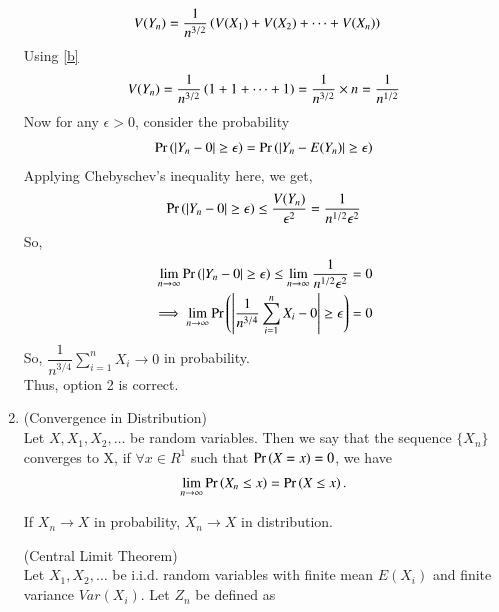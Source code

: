 \documentclass[journal,12pt,twocolumn]{IEEEtran}
\begin{document}
\begin{enumerate}
\begin{align}
            V(Y_n) &= \dfrac{1}{n^{3/2}}\left(V(X_1)+V(X_2)+ \dots +V(X_n)\right)
        \end{align}
        Using \eqref{b}
        \begin{align}
            V(Y_n)=\dfrac{1}{n^{3/2}}\left(1+1+ \dots +1\right)=\dfrac{1}{n^{3/2}}\times n=\dfrac{1}{n^{1/2}}
        \end{align}
        Now for any $\epsilon>0$, consider the probability
        \begin{align}
            \Pr\left(|Y_n-0|\geq \epsilon\right)=\Pr\left(|Y_n-E(Y_n)|\geq \epsilon\right)
        \end{align}
        Applying Chebyschev's inequality here, we get,
        \begin{align}
            \Pr\left(|Y_n-0|\geq \epsilon\right) \leq \dfrac{V(Y_n)}{\epsilon^2} = \dfrac{1}{n^{1/2}\epsilon^2}
        \end{align}
        So,
        \begin{align}
            \lim_{n \to \infty}\Pr\left(|Y_n-0|\geq \epsilon\right) \leq \lim_{n \to \infty }\dfrac{1}{n^{1/2}\epsilon^2}=0\\
            \implies \lim_{n \to \infty}\Pr\left(\left | \dfrac{1}{n^{3/4}}\sum_{i=1}^nX_i - 0 \right|\geq \epsilon\right)=0
        \end{align}
        So, $\dfrac{1}{n^{3/4}}\sum_{i=1}^nX_i \to 0$ in probability.\\
        Thus, option 2 is correct.
    \item
        \begin{definition}
        (Convergence in Distribution)\\
        Let $X, X_1, X_2,\dots $ be random variables. Then we say that the sequence $\{X_n\}$ converges to X, if $\forall x \in R^1$ such that $\Pr\left(X=x\right)=0$, we have
        \begin{align}
            \lim_{n \to \infty}\Pr\left(X_n \leq x\right)=\Pr\left(X \leq x\right).
        \end{align}
        \end{definition}
        \begin{theorem} \label{t-1}
        If $X_n \to X$ in probability, $X_n \to X$ in distribution.
        \end{theorem}
        \newpage
        \begin{theorem}
        (Central Limit Theorem)\\
        Let $X_1, X_2,\dots$ be i.i.d. random variables with finite mean $E(X_i)$ and finite variance $Var(X_i)$. Let $Z_n$ be defined as
        \begin{align}

\end{align}
\end{theorem}
\end{enumerate}
\end{document}
